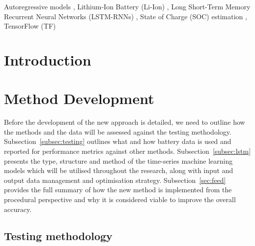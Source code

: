 \documentclass[a4paper,fleqn]{cas-dc}
\begin{document}

\begin{keywords}
  Autoregressive models \sep
  Lithium-Ion Battery (Li-Ion) \sep
  Long Short-Term Memory Recurrent Neural Networks (LSTM-RNNs) \sep
  State of Charge (SOC) estimation \sep
  TensorFlow (TF)
\end{keywords}

\maketitle

\section{Introduction}\label{sec:introduction}


\section{Method Development} \label{sec:layer}
Before the development of the new approach is detailed, we need to outline how the methods and the data will be assessed against the testing methodology.
Subsection~\ref{subsec:testing} outlines what and how battery data is used and reported for performance metrics against other methods.
Subsection~\ref{subsec:lstm} presents the type, structure and method of the time-series machine learning models which will be utilised throughout the research, along with input and output data management and optimisation strategy.
Subsection~\ref{sec:feed} provides the full summary of how the new method is implemented from the procedural perspective and why it is considered viable to improve the overall accuracy.
\subsection{Testing methodology}~\label{subsec:testing}
  
\end{document}
